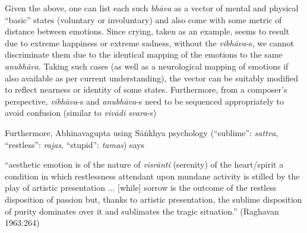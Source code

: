 Given the above, one can list each such \textsl{bhāva} as a vector of mental and physical “basic” states (voluntary or involuntary) and also come with some metric of distance between emotions. Since crying, taken as an example, seems to result due to extreme happiness or extreme sadness, without the \textsl{vibhāva}-s, we cannot discriminate them due to the identical mapping of the emotions to the same \textsl{anubhāva}. Taking such cases (as well as a neurological mapping of emotions if also available as per current understanding), the vector can be suitably modified to reflect nearness or identity of some states. Furthermore, from a composer’s perspective, \textsl{vibhāva}-s and \textsl{anubhāva}-s need to be sequenced appropriately to avoid confusion (similar to \textsl{vivādi} \textsl{svara}-s)

\newpage

Furthermore, Abhinavagupta using Sāṅkhya psychology (“sublime”: \textsl{sattva}, “restless”: \textsl{rajas}, “stupid”: \textsl{tamas}) says

\begin{myquote}
“aesthetic emotion is of the nature of \textsl{visrānti} (serenity) of the heart/spirit a condition in which restlessness attendant upon mundane activity is stilled by the play of artistic presentation ... [while] sorrow is the outcome of the restless disposition of passion but, thanks to artistic presentation, the sublime disposition of purity dominates over it and sublimates the tragic situation.” 
\hfill(Raghavan 1963:264)
\end{myquote}

